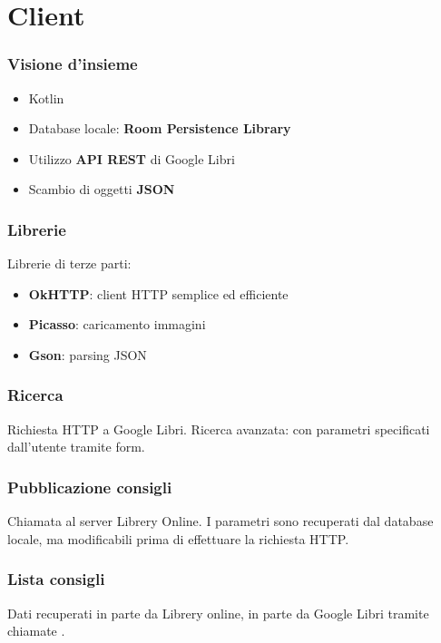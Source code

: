 \documentclass{beamer}
\begin{document}
\section{Client}
	\begin{frame}
		\frametitle{Visione d'insieme}
		\begin{itemize}
			\item Kotlin
			\item Database locale: \textbf{Room Persistence Library}
			\item Utilizzo \textbf{API REST} di Google Libri
			\item Scambio di oggetti \textbf{JSON}
		\end{itemize}
	\end{frame}
	\begin{frame}
		\frametitle{Librerie}
		Librerie di terze parti:
		\begin{itemize}
			\item \textbf{OkHTTP}: client HTTP semplice ed efficiente
			\item \textbf{Picasso}: caricamento immagini
			\item \textbf{Gson}: parsing JSON
		\end{itemize}
	\end{frame}
	\begin{frame}
		\frametitle{Ricerca}
		Richiesta HTTP a Google Libri. Ricerca avanzata:  con parametri specificati dall'utente tramite form.
	\end{frame}
	\begin{frame}
		\frametitle{Pubblicazione consigli}
		Chiamata  al server Librery Online. I parametri sono recuperati dal database locale, ma modificabili prima di effettuare la richiesta HTTP.
	\end{frame}
	\begin{frame}
		\frametitle{Lista consigli}
		Dati recuperati in parte da Librery online, in parte da Google Libri tramite chiamate \code{GET}.
	\end{frame}
\end{document}
